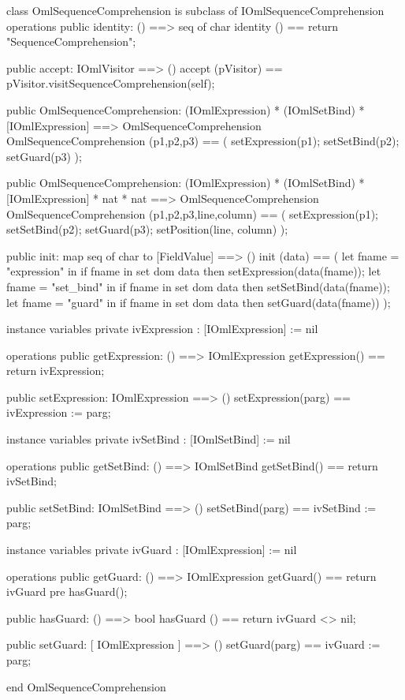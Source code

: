 \begin{vdm_al}
class OmlSequenceComprehension is subclass of IOmlSequenceComprehension
operations
  public identity: () ==> seq of char
  identity () == return "SequenceComprehension";

  public accept: IOmlVisitor ==> ()
  accept (pVisitor) == pVisitor.visitSequenceComprehension(self);

  public OmlSequenceComprehension:
    (IOmlExpression) *
    (IOmlSetBind) *
    [IOmlExpression] ==> OmlSequenceComprehension
  OmlSequenceComprehension (p1,p2,p3) == 
    ( setExpression(p1);
      setSetBind(p2);
      setGuard(p3) );

  public OmlSequenceComprehension:
    (IOmlExpression) *
    (IOmlSetBind) *
    [IOmlExpression] *
    nat *
    nat ==> OmlSequenceComprehension
  OmlSequenceComprehension (p1,p2,p3,line,column) == 
    ( setExpression(p1);
      setSetBind(p2);
      setGuard(p3);
      setPosition(line, column) );

  public init: map seq of char to [FieldValue] ==> ()
  init (data) ==
    ( let fname = "expression" in
        if fname in set dom data
        then setExpression(data(fname));
      let fname = "set_bind" in
        if fname in set dom data
        then setSetBind(data(fname));
      let fname = "guard" in
        if fname in set dom data
        then setGuard(data(fname)) );

instance variables
  private ivExpression : [IOmlExpression] := nil

operations
  public getExpression: () ==> IOmlExpression
  getExpression() == return ivExpression;

  public setExpression: IOmlExpression ==> ()
  setExpression(parg) == ivExpression := parg;

instance variables
  private ivSetBind : [IOmlSetBind] := nil

operations
  public getSetBind: () ==> IOmlSetBind
  getSetBind() == return ivSetBind;

  public setSetBind: IOmlSetBind ==> ()
  setSetBind(parg) == ivSetBind := parg;

instance variables
  private ivGuard : [IOmlExpression] := nil

operations
  public getGuard: () ==> IOmlExpression
  getGuard() == return ivGuard
    pre hasGuard();

  public hasGuard: () ==> bool
  hasGuard () == return ivGuard <> nil;

  public setGuard: [ IOmlExpression ] ==> ()
  setGuard(parg) == ivGuard := parg;

end OmlSequenceComprehension
\end{vdm_al}

